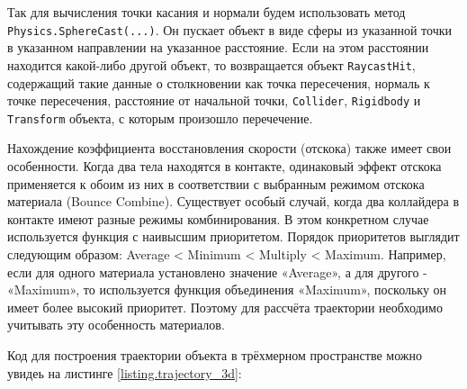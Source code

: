 Так для вычисления точки касания и нормали будем использовать метод \lstinline|Physics.SphereCast(...)|. Он пускает объект в виде сферы из указанной точки в указанном направлении на указанное расстояние. Если на этом расстоянии находится какой-либо другой объект, то возвращается объект \lstinline|RaycastHit|, содержащий такие данные о столкновении как точка пересечения, нормаль к точке пересечения, расстояние от начальной точки, \lstinline|Collider|, \lstinline|Rigidbody| и \lstinline|Transform| объекта, с которым произошло перечечение.

Нахождение коэффициента восстановления скорости (отскока) также имеет свои особенности. Когда два тела находятся в контакте, одинаковый эффект отскока применяется к обоим из них в соответствии с выбранным режимом отскока материала (Bounce Combine). Существует особый случай, когда два коллайдера в контакте имеют разные режимы комбинирования. В этом конкретном случае используется функция с наивысшим приоритетом. Порядок приоритетов выглядит следующим образом: Average < Minimum < Multiply < Maximum. Например, если для одного материала установлено значение «Average», а для другого - «Maximum», то используется функция объединения «Maximum», поскольку он имеет более высокий приоритет. Поэтому для рассчёта траектории необходимо учитывать эту особенность материалов.

Код для построения траектории объекта в трёхмерном пространстве можно увидеь на листинге \ref{listing.trajectory_3d}:

